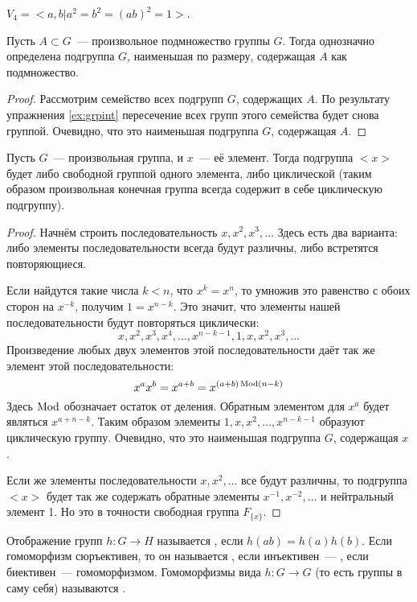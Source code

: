 \begin{example}
	$V_4 = <a, b | a^2 = b^2 = (ab)^2 = 1>$.
\end{example}

\begin{thm}
	Пусть $A\subset G$~--- произвольное подмножество группы $G$. Тогда однозначно определена подгруппа $G$, наименьшая по размеру, содержащая $A$ как подмножество.
\end{thm}
\begin{proof}
	Рассмотрим семейство всех подгрупп $G$, содержащих $A$. По результату упражнения \ref{ex:grpint} пересечение всех групп этого семейства будет снова группой. Очевидно, что это наименьшая подгруппа $G$, содержащая $A$.
\end{proof}

\begin{thm}
	Пусть $G$~--- произвольная группа, и $x$~--- её элемент. Тогда подгруппа $<x>$ будет либо свободной группой одного элемента, либо циклической (таким образом произвольная конечная группа всегда содержит в себе циклическую подгруппу).
\end{thm}
\begin{proof}
	Начнём строить последовательность $x, x^2, x^3, \ldots$ Здесь есть два варианта: либо элементы последовательности всегда будут различны, либо встретятся повторяющиеся.
	
	Если найдутся такие числа $k<n$, что $x^k = x^n$, то умножив это равенство с обоих сторон на $x^{-k}$, получим $1 = x^{n-k}$. Это значит, что элементы нашей последовательности будут повторяться циклически:
	\[
	x, x^2, x^3, x^4, \ldots, x^{n-k-1}, 1, x, x^2, x^3, \ldots
	\]
	Произведение любых двух элементов этой последовательности даёт так же элемент этой последовательности:
	\[
	x^a x^b = x^{a + b} = x^{(a+b)\operatorname{Mod} (n-k)}
	\]
	Здесь $\operatorname{Mod}$ обозначает остаток от деления. Обратным элементом для $x^a$ будет являться $x^{a+n-k}$. Таким образом элементы $1, x, x^2, \ldots, x^{n-k-1}$ образуют циклическую группу. Очевидно, что это наименьшая подгруппа $G$, содержащая $x$.
	
	Если же элементы последовательности $x, x^2, \ldots$ все будут различны, то подгруппа $<x>$ будет так же содержать обратные элементы $x^{-1}, x^{-2}, \ldots$ и нейтральный элемент 1. Но это в точности свободная группа $F_{\{x\}}$.
\end{proof}

\begin{definition}
	Отображение групп $h:G\to H$ называется , если $h(ab) = h(a)h(b)$. Если гомоморфизм сюръективен, то он называется , если инъективен~--- , если биективен~--- гомоморфизмом. Гомоморфизмы вида $h:G\to G$ (то есть группы в саму себя) называются .
\end{definition}

